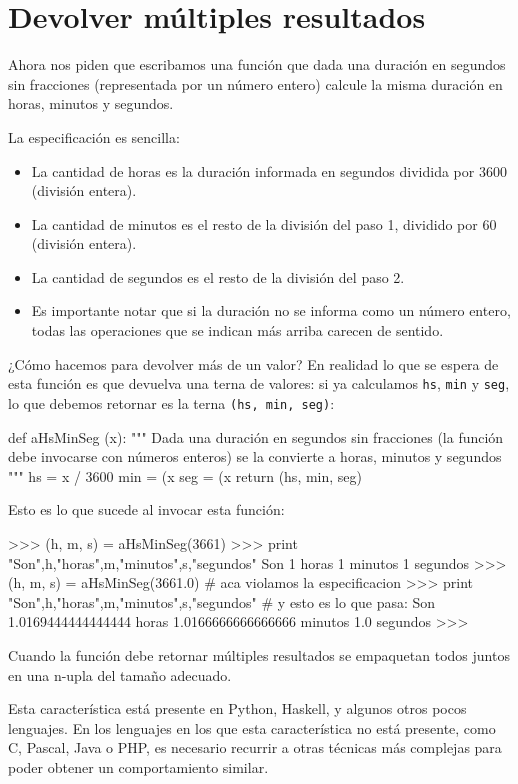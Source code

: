 \section{Devolver múltiples resultados}
\label{fun:multiple_return}
Ahora nos piden que escribamos una función que dada una duración
en segundos sin fracciones (representada por un número entero) calcule
la misma duración en horas, minutos y segundos.

La especificación es sencilla:
\begin{itemize}
\item La cantidad de horas es la duración informada en segundos dividida
por 3600 (división entera).
\item La cantidad de minutos es el resto de la división del paso 1,
dividido por 60 (división entera).
\item La cantidad de segundos es el resto de la división del paso 2.
\item Es importante notar que si la duración no se informa como un número
entero, todas las operaciones que se indican más arriba carecen de sentido.
\end{itemize}

¿Cómo hacemos para devolver más de un valor? En realidad lo que se espera
de esta función es que devuelva una terna de valores: si ya calculamos
\lstinline!hs!, \lstinline!min! y \lstinline!seg!, lo que debemos retornar
es la terna \lstinline+(hs, min, seg)+:

\begin{codigo-python}
def aHsMinSeg (x):
   """ Dada una duración en segundos sin fracciones
      (la función debe invocarse con números enteros)
      se la convierte a horas, minutos y segundos """
   hs = x / 3600
   min = (x %
   seg = (x %
   return (hs, min, seg)
\end{codigo-python}

Esto es lo que sucede al invocar esta función:

\begin{codigo-python-sn}
>>> (h, m, s) = aHsMinSeg(3661)
>>> print "Son",h,"horas",m,"minutos",s,"segundos"
Son 1 horas 1 minutos 1 segundos
>>> (h, m, s) = aHsMinSeg(3661.0)  # aca violamos la especificacion
>>> print "Son",h,"horas",m,"minutos",s,"segundos" # y esto es lo que pasa:
Son 1.0169444444444444 horas 1.0166666666666666 minutos 1.0 segundos
>>>
\end{codigo-python-sn}

\begin{sabias_que}
Cuando la función debe retornar múltiples resultados se empaquetan todos juntos
en una n-upla del tamaño adecuado.

Esta característica está presente en Python, Haskell, y algunos otros pocos
lenguajes.  En los lenguajes en los que esta característica no está
presente, como C, Pascal, Java o PHP, es necesario recurrir a otras
técnicas más complejas para poder obtener un comportamiento similar.
\end{sabias_que}

